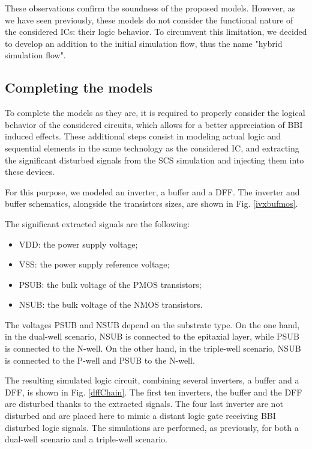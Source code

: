 	These observations confirm the soundness of the proposed models.
	However, as we have seen previously, these models do not consider the functional nature of the considered ICs: their logic behavior.
	To circumvent this limitation, we decided to develop an addition to the initial simulation flow, thus the name "hybrid simulation flow".

\subsection{Completing the models}
	To complete the models as they are, it is required to properly consider the logical behavior of the considered circuits, which allows for a better appreciation of BBI induced effects.
	These additional steps consist in modeling actual logic and sequential elements  in the same technology as the considered IC, and extracting the significant disturbed signals from the SCS simulation and injecting them into these devices.
	
	For this purpose, we modeled an inverter, a buffer and a DFF.
	The inverter and buffer schematics, alongside the transistors sizes, are shown in Fig. \ref{ivxbufmos}.
%	

	The significant extracted signals are the following:
	\begin{itemize}
		\item VDD: the power supply voltage;
		\item VSS: the power supply reference voltage;
		\item PSUB: the bulk voltage of the PMOS transistors;
		\item NSUB: the bulk voltage of the NMOS transistors.
	\end{itemize}
	The voltages PSUB and NSUB depend on the substrate type.
	On the one hand, in the dual-well scenario, NSUB is connected to the epitaxial layer, while PSUB is connected to the N-well.
	On the other hand, in the triple-well scenario, NSUB is connected to the P-well and PSUB to the N-well.
	
	The resulting simulated logic circuit, combining several inverters, a buffer and a DFF, is shown in Fig. \ref{dffChain}.
	The first ten inverters, the buffer and the DFF are disturbed thanks to the extracted signals.
	The four last inverter are not disturbed and are placed here to mimic a distant logic gate receiving BBI disturbed logic signals.
	The simulations are performed, as previously, for both a dual-well scenario and a triple-well scenario.
